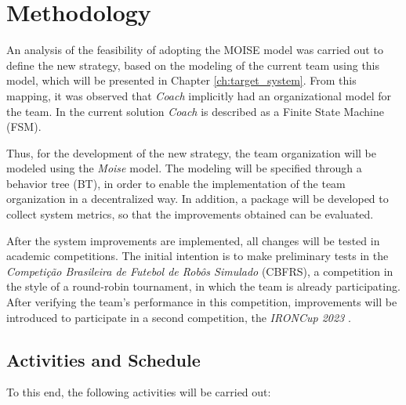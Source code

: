 \chapter{Methodology}
\label{ch:methodology}

An analysis of the feasibility of adopting the MOISE \cite{MOISEp} model was carried out to define the new strategy, based on the modeling of the current team using this model, which will be presented in Chapter \ref{ch:target_system}. From this mapping, it was observed that \textit{Coach} implicitly had an organizational model for the team. In the current solution \textit{Coach} is described as a Finite State Machine (FSM).

Thus, for the development of the new strategy, the team organization will be modeled using the \textit{Moise} \cite{MOISEp} model. The modeling will be specified through a behavior tree (BT), in order to enable the implementation of the team organization in a decentralized way. In addition, a package will be developed to collect system metrics, so that the improvements obtained can be evaluated.

After the system improvements are implemented, all changes will be tested in academic competitions. The initial intention is to make preliminary tests in the \textit{Competição Brasileira de Futebol de Robôs Simulado} (CBFRS), a competition in the style of a round-robin tournament, in which the team is already participating. After verifying the team's performance in this competition, improvements will be introduced to participate in a second competition, the \textit{IRONCup 2023} \cite{IRONCup2023}.

\section{Activities and Schedule}

To this end, the following activities will be carried out:

